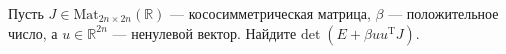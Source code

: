 \documentclass{article}
\begin{document}
Пусть $J \in \mathrm{Mat}_{2n\times 2n} (\mathbb{R})$ --- кососимметрическая матрица, 
$\beta$ --- положительное число, а $u \in \mathbb{R}^{2n}$ --- ненулевой вектор. Найдите 
$\mathrm{det}\;(E + \beta u u^{\mathrm{T}} J)$.
\end{document}
